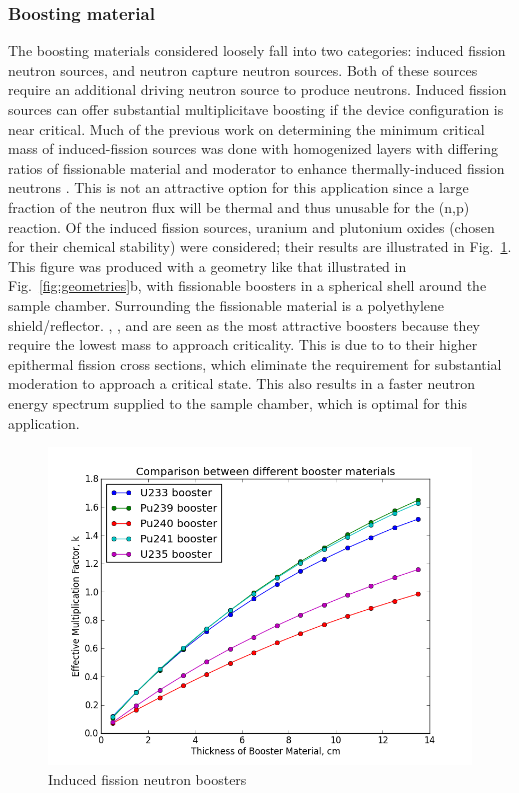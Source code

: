 \documentclass{mc2015}
\begin{document}
\subsubsection{Boosting material}

The boosting materials considered loosely fall into two categories: induced fission neutron sources, and neutron capture neutron sources. Both of these sources require an additional driving neutron source to produce neutrons. Induced fission sources can offer substantial multiplicitave boosting if the device configuration is near critical.  Much of the previous work on determining the minimum critical mass of induced-fission sources  was done with homogenized layers with differing ratios of fissionable material and moderator to enhance thermally-induced fission neutrons \cite{karni_semi-automated_keff,karni_smores_2003,goluoglu_smoresnew_2002}. This is not an attractive option for this application since a large fraction of the neutron flux will be thermal and thus unusable for the (n,p) reaction. Of the induced fission sources, uranium and plutonium oxides (chosen for their chemical stability) were considered; their results are illustrated in Fig.\ \ref{fig:boosters}. This figure was produced with a geometry like that illustrated in Fig.\ \ref{fig:geometries}b, with fissionable boosters in a spherical shell around the sample chamber. Surrounding the fissionable material is a polyethylene shield/reflector. , , and  are seen as the most attractive boosters because they require the lowest mass to approach criticality. This is due to to their higher epithermal fission cross sections, which eliminate the requirement for substantial moderation to approach a critical state. This also results in a faster neutron energy spectrum supplied to the sample chamber, which is optimal for this application. 

\begin{figure}
  \centering
  \includegraphics[width=4.5in]{Boosters.png}
  \caption{Induced fission neutron boosters}
  \label{fig:boosters}
\end{figure}
\end{document}
